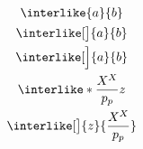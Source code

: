 \documentclass[12pt, a4paper]{article}
\begin{document}
\begin{gather*}
\interlike{a}{b} \\
\interlike[\big]{a}{b} \\
\interlike[\Big]{a}{b} \\
\interlike*{\frac{X^X}{p_p}}{z} \\
\interlike[\big]{z}{\frac{X^X}{p_p}}
\end{gather*}
\end{document}
